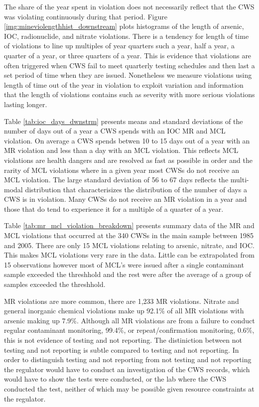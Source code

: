 \documentclass{article}
\begin{document}
The share of the year spent in violation does not necessarily reflect that the CWS was violating continuously during that period. Figure \ref{img:mineviolengthhist_downstream} plots histograms of the length of arsenic, IOC, radionuclide, and nitrate violations. There is a tendency for length of time of violations to line up multiples of year quarters such a year, half a year, a quarter of a year, or three quarters of a year. This is evidence that violations are often triggered when CWS fail to meet quarterly testing schedules and then last a set period of time when they are issued. Nonetheless we measure violations using length of time out of the year in violation to exploit variation and information that the length of violations contains such as severity with more serious violations lasting longer. 

Table \ref{tab:ioc_days_dwnstrm} presents means and standard deviations of the number of days out of a year a CWS spends with an IOC MR and MCL violation. On average a CWS spends betwen 10 to 15 days out of a year with an MR violation and less than a day with an MCL violation. This reflects  MCL violations are health dangers and are resolved as fast as possible in order and the rarity of MCL violations where in a given year most CWSs do not receive an MCL violation. The large standard deviation of 56 to 67 days reflects the multi-modal distribution that characterisizes the distribution of the number of days a CWS is in violation. Many CWSs do not receive an MR violation in a year and those that do tend to experience it for a multiple of a quarter of a year. 

Table \ref{tab:mr_mcl_violation_breakdown} presents summary data of the MR and MCL violations that occurred at the 340 CWSs in the main sample between 1985 and 2005. There are only 15 MCL violations relating to arsenic, nitrate, and IOC. This makes MCL violations very rare in the data. Little can be extrapolated from 15 observations however most of MCL's were issued after a single contaminant sample exceeded the threshhold and the rest were after the average of a group of samples exceeded the threshhold.

MR violations are more common, there are 1,233 MR violations. Nitrate and general inorganic chemical violations make up 92.1\% of all MR violations with arsenic making up 7.9\%. Although all MR violations are from a failure to conduct regular contaminant monitoring, 99.4\%, or repeat/confirmation monitoring, 0.6\%, this is not evidence of testing and not reporting. The distiniction between not testing and not reporting is subtle compared to testing and not reporting. In order to distinguish testing and not reporting from not testing and not reporting the regulator would have to conduct an investigation of the CWS records, which would have to show the tests were conducted, or the lab where the CWS conducted the test, neither of which may be possible given resource constraints at the regulator.
\end{document}
